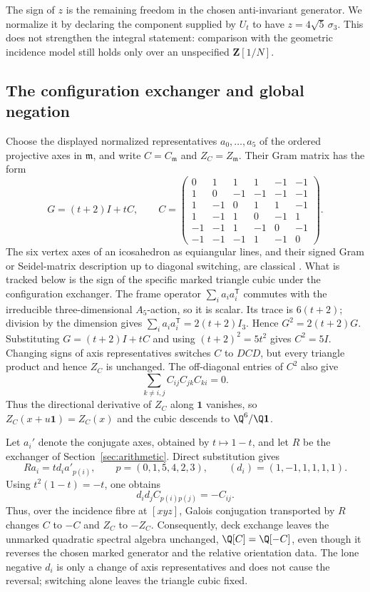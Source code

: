 The sign of \(z\) is the remaining freedom in the chosen anti-invariant
generator.  We normalize it by declaring the component supplied by \(U_t\)
to have \(z=4\sqrt5\,\sigma_3\).  This does not strengthen the integral
statement: comparison with the geometric incidence model still holds only
over an unspecified \(\mathbf Z[1/N]\).

\subsection{The configuration exchanger and global negation}

Choose the displayed normalized representatives
\(a_0,\ldots,a_5\) of the ordered projective axes in \(\mathfrak m\), and
write \(C=C_{\mathfrak m}\) and \(Z_C=Z_{\mathfrak m}\).  Their Gram
matrix has the form
\[
 G=(t+2)I+tC,
\qquad
C=\begin{pmatrix}
0&1&1&1&-1&-1\\
1&0&-1&-1&-1&-1\\
1&-1&0&1&1&-1\\
1&-1&1&0&-1&1\\
-1&-1&1&-1&0&-1\\
-1&-1&-1&1&-1&0
\end{pmatrix}.
\]
The six vertex axes of an icosahedron as equiangular lines, and their signed
Gram or Seidel-matrix description up to diagonal switching, are classical
\cite[\S3]{GodsilProblems}.  What is tracked below is the sign of the
specific marked triangle cubic under the configuration exchanger.
The frame operator \(\sum_i a_ia_i^{\mathsf T}\) commutes with the
irreducible three-dimensional \(A_5\)-action, so it is scalar.  Its trace is
\(6(t+2)\); division by the dimension gives
\(\sum_i a_ia_i^{\mathsf T}=2(t+2)I_3\).  Hence
\(G^2=2(t+2)G\).  Substituting \(G=(t+2)I+tC\) and using
\((t+2)^2=5t^2\) gives \(C^2=5I\).  Changing signs of axis
representatives switches \(C\) to \(DCD\), but every triangle product and
hence \(Z_C\) is unchanged.  The off-diagonal entries of \(C^2\) also give
\[
 \sum_{k\ne i,j}C_{ij}C_{jk}C_{ki}=0.
\]
Thus the directional derivative of \(Z_C\) along \(\mathbf1\) vanishes, so
\(Z_C(x+u\mathbf1)=Z_C(x)\) and the cubic descends to
\(\Q^6/\Q\mathbf1\).

Let \(a_i'\) denote the conjugate axes, obtained by \(t\mapsto1-t\), and
let \(R\) be the exchanger of Section~\ref{sec:arithmetic}.  Direct
substitution gives
\[
 Ra_i=t d_i a'_{p(i)},\qquad
 p=(0,1,5,4,2,3),\qquad
 (d_i)=(1,-1,1,1,1,1).
\]
Using \(t^2(1-t)=-t\), one obtains
\[
 d_id_jC_{p(i)p(j)}=-C_{ij}.
\]
Thus, over the incidence fibre at \([xyz]\), Galois conjugation transported
by \(R\) changes \(C\)
to \(-C\) and \(Z_C\) to \(-Z_C\).  Consequently, deck exchange leaves the unmarked
quadratic spectral algebra unchanged, \(\Q[C]=\Q[-C]\), even though it reverses
the chosen marked generator and the relative orientation data.  The lone
negative \(d_i\) is only a change of axis representatives and does not cause
the reversal; switching alone leaves the triangle cubic fixed.

